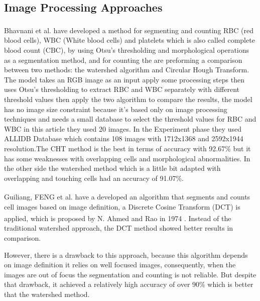 \subsection{Image Processing Approaches}
\hspace{\parindent}
Bhavnani et al. \textsuperscript{\cite{bhavnani2016segmentation}} have developed a method for segmenting and counting RBC (red blood cells), WBC (White blood cells) and platelets which is also called complete blood count (CBC), by using Otsu’s thresholding and morphological operations as a segmentation method, and for counting the are preforming a comparison between two methods: the watershed algorithm and Circular Hough Transform. The model takes an RGB image as an input apply some processing steps then uses Otsu's thresholding to extract RBC and WBC separately with different threshold values then apply the two algorithm to compare the results, the model has no image size constraint because it's based only on image processing techniques and needs a small database to select the threshold values for RBC and WBC in this article they used 20 images. In the Experiment phase they used ALLIDB Database which contains 108 images with 1712x1368 and 2592x1944 resolution.The CHT method is the best in terms of accuracy with 92.67\% but it has some weaknesses with overlapping cells and morphological abnormalities. In the other side the watershed method which is a little bit adapted with overlapping and touching cells had an accuracy of 91.07\%.\

Guiliang, FENG et al. \textsuperscript{\cite{guiliang2016microscopic}} have a developed an algorithm that segments and counts cell images based on image definition, a Discrete Cosine Transform (DCT) is applied, which is proposed by N. Ahmed and Rao in 1974 \textsuperscript{\cite{ahmed1974discrete}}. Instead of the traditional watershed approach, the DCT method showed better results in comparison.\

However, there is a drawback to this approach, because this algorithm depends on image definition it relies on well focused images, consequently, when the images are out of focus the segmentation and counting is not reliable. But despite that drawback, it achieved a relatively high accuracy of over 90\% which is better that the watershed method.\\

